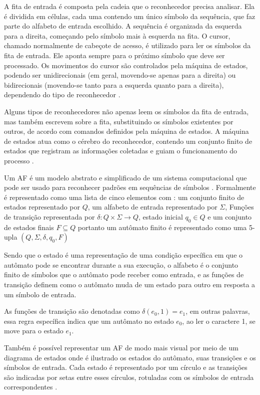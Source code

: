 A fita de entrada é composta pela cadeia que o reconhecedor precisa analisar. Ela é dividida em células, cada uma contendo um único símbolo da sequência, que faz parte do alfabeto de entrada escolhido. A sequência é organizada da esquerda para a direita, começando pelo símbolo mais à esquerda na fita. O cursor, chamado normalmente de cabeçote de acesso, é utilizado para ler os símbolos da fita de entrada. Ele aponta sempre para o próximo símbolo que deve ser processado. Os movimentos do cursor são controlados pela máquina de estados, podendo ser unidirecionais (em geral, movendo-se apenas para a direita) ou bidirecionais (movendo-se tanto para a esquerda quanto para a direita), dependendo do tipo de reconhecedor \cite{fundamentosComputacao}.

Alguns tipos de reconhecedores não apenas leem os símbolos da fita de entrada, mas também escrevem sobre a fita, substituindo os símbolos existentes por outros, de acordo com comandos definidos pela máquina de estados. A máquina de estados atua como o cérebro do reconhecedor, contendo um conjunto finito de estados que registram as informações coletadas e guiam o funcionamento do processo \cite{fundamentosComputacao}.


Um \ac{AF} é um modelo abstrato e simplificado de um sistema computacional que pode ser usado para reconhecer padrões em sequências de símbolos \cite{afd}. Formalmente é representado como uma lista de cinco elementos  com : 
um conjunto finito de estados representado por $Q$, um alfabeto de entrada representado por $\Sigma$, Funções de transição representada por $\delta : Q \times \Sigma \rightarrow Q$, estado inicial $q_0 \in Q$ e um conjunto de estados finais $F \subseteq Q$ portanto um autômato finito é representado como uma 5-upla $(Q, \Sigma, \delta, q_0, F)$

Sendo que o estado é uma representação de uma condição específica em que o autômato pode se encontrar durante a sua execução, o alfabeto é o conjunto finito de símbolos que o autômato pode receber como entrada, e as funções de transição definem como o autômato muda de um estado para outro em resposta a um símbolo de entrada.

As funções de transição são denotadas como $\delta(e_0, 1) = e_1$, em outras palavras, essa regra específica indica que um autômato no estado $e_0$, ao ler o caractere 1, se move para o estado $e_1$.

Também é possível representar um \ac{AF} de modo mais visual por meio de um diagrama de estados onde é ilustrado os estados do autômato, suas transições e os símbolos de entrada. Cada estado é representado por um círculo e as transições são indicadas por setas entre esses círculos, rotuladas com os símbolos de entrada correspondentes \cite{afd}.

